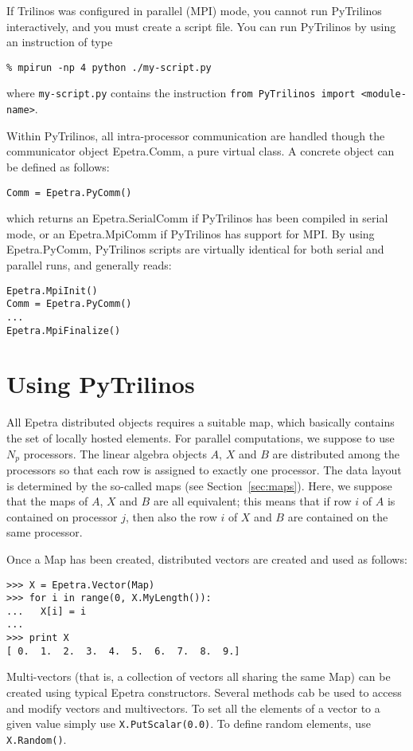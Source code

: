 \documentclass[10pt,relax]{SANDreport}
\begin{document}
If Trilinos was configured in parallel (MPI) mode, you cannot run PyTrilinos
interactively, and you must create a script file. You can run PyTrilinos by
using an instruction of type
\begin{verbatim}
% mpirun -np 4 python ./my-script.py
\end{verbatim}
where \verb!my-script.py! contains the instruction \verb!from PyTrilinos import <module-name>!.

Within PyTrilinos, all intra-processor communication are handled though the
communicator object Epetra.Comm, a pure virtual class. A concrete object can
be defined as follows:
\begin{verbatim}
Comm = Epetra.PyComm()
\end{verbatim}
which returns an Epetra.SerialComm if PyTrilinos has been compiled in serial
mode, or an Epetra.MpiComm if PyTrilinos has support for MPI. By using
Epetra.PyComm, PyTrilinos scripts are virtually identical for both serial and
parallel runs, and generally reads:
\begin{verbatim}
Epetra.MpiInit()
Comm = Epetra.PyComm()
...
Epetra.MpiFinalize()
\end{verbatim}

\section{Using PyTrilinos}
\label{sec:using}

All Epetra distributed objects requires a suitable map, which basically
contains the set of locally hosted elements.
For parallel computations, we suppose to use $N_p$ processors. The linear
algebra objects $A$, $X$ and $B$ are distributed among the processors so that
each row is assigned to exactly one processor. The data layout is determined
by the so-called maps (see Section~\ref{sec:maps}). Here, we suppose that the
maps of $A$, $X$ and $B$ are all equivalent; this means that if row $i$ of $A$
is contained on processor $j$, then also the row $i$ of $X$ and $B$ are
contained on the same processor.

\smallskip

Once a Map has been created, distributed vectors are created and used as follows:
\begin{verbatim}
>>> X = Epetra.Vector(Map)
>>> for i in range(0, X.MyLength()):
...   X[i] = i
... 
>>> print X
[ 0.  1.  2.  3.  4.  5.  6.  7.  8.  9.]
\end{verbatim}
Multi-vectors (that is, a collection of vectors all sharing the same Map) can
be created using typical Epetra constructors. Several methods cab be used to
access and modify vectors and multivectors.  To set all the elements of a
vector to a given value simply use {\tt X.PutScalar(0.0)}. To define random
elements, use {\tt X.Random()}.
\end{document}
